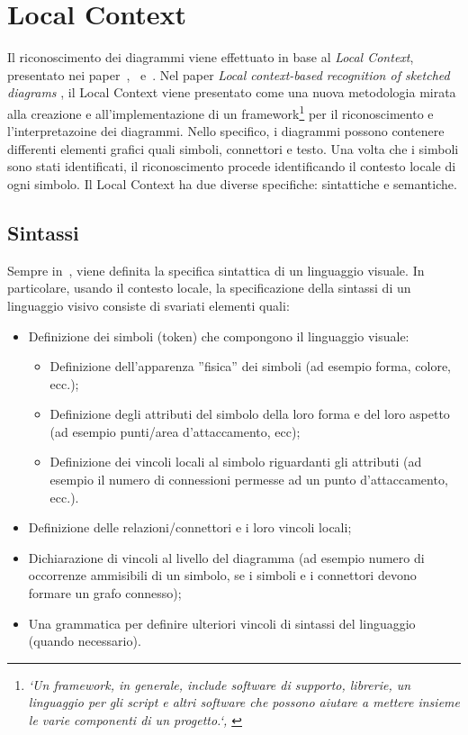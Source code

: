 \chapter{Local Context}\label{ch:localcontext}
    Il riconoscimento dei diagrammi viene effettuato in base al \textit{Local Context}, presentato nei paper~\cite{localcontext_recognition},~\cite{extending_localcontext} e~\cite{localcontext}.
    \newline
    Nel paper \textit{Local context-based recognition of sketched diagrams} \cite{localcontext_recognition}, il Local Context viene presentato come una nuova metodologia mirata alla creazione e all'implementazione di un framework\footnote{\textit{`Un framework, in generale, include software di supporto, librerie, un linguaggio per gli script e altri software che possono aiutare a mettere insieme le varie componenti di un progetto.`, \cite{framework}}} per il riconoscimento e l'interpretazoine dei diagrammi. Nello specifico, i diagrammi possono contenere differenti elementi grafici quali simboli, connettori e testo. Una volta che i simboli sono stati identificati, il riconoscimento procede identificando il contesto locale di ogni simbolo.
    Il Local Context ha due diverse specifiche: sintattiche e semantiche.
    \section{Sintassi}
        Sempre in~\cite{localcontext_recognition}, viene definita la specifica sintattica di un linguaggio visuale.
        In particolare, usando il contesto locale, la specificazione della sintassi di un linguaggio visivo consiste di svariati elementi quali:
        \begin{itemize}
            \item Definizione dei simboli (token) che compongono il linguaggio visuale:
            \begin{itemize}
                \item Definizione dell'apparenza ''fisica'' dei simboli (ad esempio forma, colore, ecc.);
                \item Definizione degli attributi del simbolo della loro forma e del loro aspetto (ad esempio punti/area d'attaccamento, ecc);
                \item Definizione dei vincoli locali al simbolo riguardanti gli attributi (ad esempio il numero di connessioni permesse ad un punto d'attaccamento, ecc.).
            \end{itemize}
            \item Definizione delle relazioni/connettori e i loro vincoli locali;
            \item Dichiarazione di vincoli al livello del diagramma (ad esempio numero di occorrenze ammisibili di un simbolo, se i simboli e i connettori devono formare un grafo connesso);
            \item Una grammatica per definire ulteriori vincoli di sintassi del linguaggio (quando necessario).
        \end{itemize}

